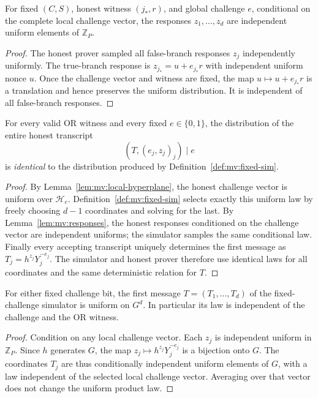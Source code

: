 \begin{lemma}\label{lem:mv:responses}
For fixed $(C,S)$, honest witness $(j_*,r)$,
and global challenge $e$, conditional on
the complete local challenge vector,
the responses $z_1,\dots,z_d$
are independent uniform elements of $\mathbb Z_P$.
\end{lemma}
\begin{proof}
The honest prover sampled all false-branch
responses $z_j$ independently uniformly.
The true-branch response is
$z_{j_*}=u+e_{j_*}r$ with independent
uniform nonce $u$.
Once the challenge vector and witness are
fixed, the map $u\mapsto u+e_{j_*}r$
is a translation and hence preserves the
uniform distribution. It is independent
of all false-branch responses.
\end{proof}

\begin{theorem}\label{thm:mv:fixed-perfect}
For every valid OR witness and every fixed
$e\in\{0,1\}$, the distribution of the entire
honest transcript
\[
 (T,(e_j,z_j)_j)\mid e
\]
is \emph{identical} to the distribution produced
by Definition~\ref{def:mv:fixed-sim}.
\end{theorem}
\begin{proof}
By Lemma~\ref{lem:mv:local-hyperplane},
the honest challenge vector is uniform over
$\mathcal H_e$. Definition~\ref{def:mv:fixed-sim}
selects exactly this uniform law by freely
choosing $d-1$ coordinates and solving
for the last. By Lemma~\ref{lem:mv:responses},
the honest responses conditioned on the
challenge vector are independent uniforms;
the simulator samples the same conditional law.
Finally every accepting transcript uniquely
determines the first message as
$T_j=h^{z_j}Y_j^{-e_j}$.
The simulator and honest prover therefore
use identical laws for all coordinates
and the same deterministic relation for $T$.
\end{proof}

\begin{lemma}\label{lem:mv:first-uniform}
For either fixed challenge bit, the first message
$T=(T_1,\dots,T_d)$ of the fixed-challenge simulator
is uniform on $G^d$. In particular its law is
independent of the challenge and the OR witness.
\end{lemma}
\begin{proof}
Condition on any local challenge vector.
Each $z_j$ is independent uniform in $\mathbb Z_P$.
Since $h$ generates $G$, the map
$z_j\mapsto h^{z_j}Y_j^{-e_j}$
is a bijection onto $G$.
The coordinates $T_j$ are thus conditionally
independent uniform elements of $G$,
with a law independent of the selected local
challenge vector. Averaging over that vector
does not change the uniform product law.
\end{proof}

